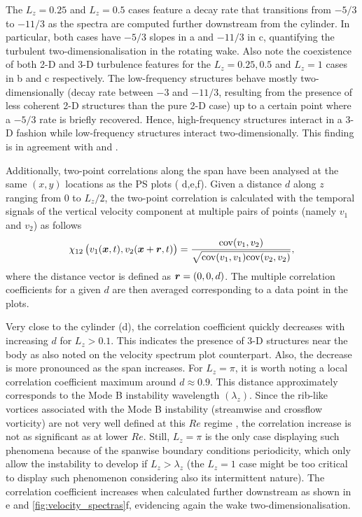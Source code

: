 \documentclass[../main.tex]{subfiles}
\begin{document}
The $L_z=0.25$ and $L_z=0.5$ cases feature a decay rate that transitions from $-5/3$ to $-11/3$ as the spectra are computed further downstream from the cylinder.
In particular, both cases have $-5/3$ slopes in a and $-11/3$ in c, quantifying the turbulent two-dimensionalisation in the rotating wake.
Also note the coexistence of both 2-D and 3-D turbulence features for the $L_z=0.25,0.5$ and $L_z=1$ cases in b and c respectively.
The low-frequency structures behave mostly two-dimensionally (decay rate between $-3$ and $-11/3$, resulting from the presence of less coherent 2-D structures than the pure 2-D case) up to a certain point where a $-5/3$ rate is briefly recovered.
Hence, high-frequency structures interact in a 3-D fashion while low-frequency structures interact two-dimensionally.
This finding is in agreement with \cite{Smith1996} and \cite{Celani2010}.

Additionally, two-point correlations along the span have been analysed at the same $(x,y)$ locations as the PS plots ( d,e,f).
Given a distance $d$ along $z$ ranging from 0 to $L_z/2$, the two-point correlation is calculated with the temporal signals of the vertical velocity component at multiple pairs of points (namely $v_1$ and $v_2$) as follows
\begin{equation}
\chi_{12}\left(v_1(\boldsymbol{x},t), v_2(\boldsymbol{x}+\boldsymbol{r},t) \right) = \frac{\mathrm{cov}(v_1, v_2)}{\sqrt{\mathrm{cov}(v_1, v_1)\mathrm{cov}(v_2, v_2)}},
\end{equation}
where the distance vector is defined as $\boldsymbol{r}=(0,0,d)$.
The multiple correlation coefficients for a given $d$ are then averaged corresponding to a data point in the plots.

Very close to the cylinder (d), the correlation coefficient quickly decreases with increasing $d$ for $L_z>0.1$.
This indicates the presence of 3-D structures near the body as also noted on the velocity spectrum plot counterpart.
Also, the decrease is more pronounced as the span increases.
For $L_z=\pi$, it is worth noting a local correlation coefficient maximum around $d \approx 0.9$.
This distance approximately corresponds to the Mode B instability wavelength $(\lambda_z)$.
Since the rib-like vortices associated with the Mode B instability (streamwise and crossflow vorticity) are not very well defined at this $Re$ regime \citep{Chyu1996}, the correlation increase is not as significant as at lower $Re$.
Still, $L_z=\pi$ is the only case displaying such phenomena because of the spanwise boundary conditions periodicity, which only allow the instability to develop if $L_z>\lambda_z$ (the $L_z=1$ case might be too critical to display such phenomenon considering also its intermittent nature).
The correlation coefficient increases when calculated further downstream as shown in e and \ref{fig:velocity_spectras}f, evidencing again the wake two-dimensionalisation.
\end{document}
